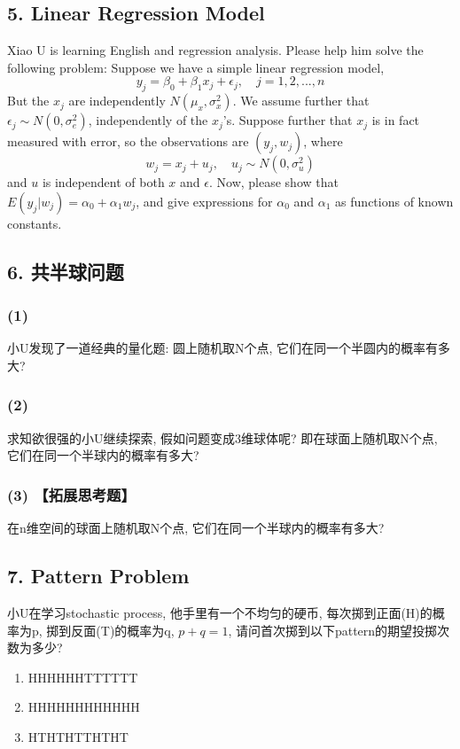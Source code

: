 \documentclass[UTF8]{ctexart}
\begin{document}
\subsection*{5. Linear Regression Model}
Xiao U is learning English and regression analysis. Please help him solve the following problem:
Suppose we have a simple linear regression model,
$$ y_{j}=\beta_{0}+\beta_{1}x_{j}+\epsilon_{j}, \quad j=1,2,...,n $$
But the $x_{j}$ are independently $N(\mu_{x},\sigma_{x}^{2})$. We assume further that $\epsilon_{j}\sim N(0,\sigma_{e}^{2})$, independently of the $x_{j}$'s.
Suppose further that $x_{j}$ is in fact measured with error, so the observations are $(y_{j},w_{j})$, where
$$ w_{j}=x_{j}+u_{j}, \quad u_{j}\sim N(0,\sigma_{u}^{2}) $$
and $u$ is independent of both $x$ and $\epsilon$.
Now, please show that $E(y_{j}|w_{j})=\alpha_{0}+\alpha_{1}w_{j}$, and give expressions for $\alpha_{0}$ and $\alpha_{1}$ as functions of known constants.

\subsection*{6. 共半球问题}
\subsubsection*{(1)}
小U发现了一道经典的量化题: 圆上随机取N个点, 它们在同一个半圆内的概率有多大?

\subsubsection*{(2)}
求知欲很强的小U继续探索, 假如问题变成3维球体呢? 即在球面上随机取N个点, 它们在同一个半球内的概率有多大?

\subsubsection*{(3) 【拓展思考题】}
在n维空间的球面上随机取N个点, 它们在同一个半球内的概率有多大?

\subsection*{7. Pattern Problem}
小U在学习stochastic process, 他手里有一个不均匀的硬币, 每次掷到正面(H)的概率为p, 掷到反面(T)的概率为q, $p+q=1$, 请问首次掷到以下pattern的期望投掷次数为多少?
\begin{enumerate}
    \item HHHHHHTTTTTT
    \item HHHHHHHHHHHH
    \item HTHTHTTHTHT
\end{enumerate}
\end{document}
